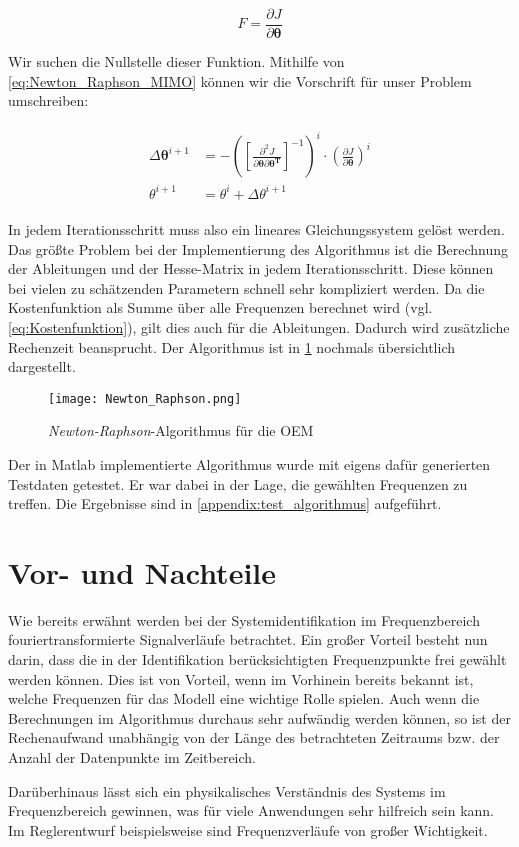 \begin{equation}
	{F} = \frac{\partial J}{\partial \mathbf{\theta}}
	\label{eq:Newton_Raphson_1}
\end{equation}

Wir suchen die Nullstelle dieser Funktion. Mithilfe von \cref{eq:Newton_Raphson_MIMO} können wir die Vorschrift für 
unser Problem umschreiben:

\begin{align}
	\begin{split}
		\Delta \mathbf{\theta}^{i+1} &= -\left(\left[  \frac{\partial^{2}J}{\partial \mathbf{\theta} \partial 
		\mathbf{\theta^T}}\right]^{-1} \right)^{i} \cdot \left(\frac{\partial J}{\partial \mathbf{\theta}}\right)^{i} \\
		\theta^{i+1} &= \theta^{i} + \Delta\theta^{i+1}
		\label{eq:Newton_Raphson_2}
	\end{split}
\end{align}

In jedem Iterationsschritt muss also ein lineares Gleichungssystem gelöst werden. Das größte Problem bei der Implementierung 
des Algorithmus ist die Berechnung der Ableitungen und der Hesse-Matrix in jedem Iterationsschritt. Diese können bei vielen 
zu schätzenden Parametern schnell sehr kompliziert werden. Da die Kostenfunktion als Summe über alle Frequenzen berechnet 
wird (vgl. \cref{eq:Kostenfunktion}), gilt dies auch für die Ableitungen. Dadurch wird zusätzliche Rechenzeit beansprucht. 
Der Algorithmus ist in \cref{fig:Newton_Raphson} nochmals übersichtlich dargestellt.  

\begin{figure}[h!]
	\centering
	\texttt{[image: Newton\_Raphson.png]}
	\caption{\textit{Newton-Raphson}-Algorithmus für die OEM}
	\label{fig:Newton_Raphson}
\end{figure}

Der in Matlab implementierte Algorithmus wurde mit eigens dafür generierten Testdaten getestet. Er war dabei in der Lage, die 
gewählten Frequenzen zu treffen. Die Ergebnisse sind in \cref{appendix:test_algorithmus} aufgeführt.



\section{Vor- und Nachteile}
Wie bereits erwähnt werden bei der Systemidentifikation im Frequenzbereich fouriertransformierte Signalverläufe betrachtet. 
Ein großer Vorteil besteht nun darin, dass die in der Identifikation berücksichtigten Frequenzpunkte frei gewählt werden 
können. Dies ist von Vorteil, wenn im Vorhinein bereits bekannt ist, welche Frequenzen für das Modell eine wichtige Rolle 
spielen. Auch wenn die Berechnungen im Algorithmus durchaus sehr aufwändig werden können, so ist der Rechenaufwand unabhängig 
von der Länge des betrachteten Zeitraums bzw. der Anzahl der Datenpunkte im Zeitbereich.\par
Darüberhinaus lässt sich ein physikalisches Verständnis des Systems im Frequenzbereich gewinnen, was für viele Anwendungen 
sehr hilfreich sein kann. Im Reglerentwurf beispielsweise sind Frequenzverläufe von großer Wichtigkeit.\\

